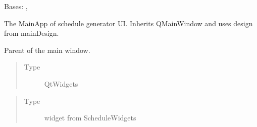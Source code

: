 \documentclass[letterpaper,10pt,english]{sphinxmanual}
\begin{document}
\begin{fulllineitems}
\label{\detokenize{NoSeMazeSchedule/scheduleMain:scheduleMain.MainApp}}
\pysigstartsignatures
{}
\pysigstopsignatures
\sphinxAtStartPar
Bases: , {\hyperref[\detokenize{NoSeMazeSchedule/ScheduleDesigns:ScheduleDesigns.mainDesign.Ui_MainWindow}]{}}

\sphinxAtStartPar
The MainApp of schedule generator UI. Inherits QMainWindow
and uses design from mainDesign.

\begin{fulllineitems}
\label{\detokenize{NoSeMazeSchedule/scheduleMain:scheduleMain.MainApp.parent}}
\pysigstartsignatures
{}
\pysigstopsignatures
\sphinxAtStartPar
Parent of the main window.
\begin{quote}\begin{description}
\item[{Type}] \leavevmode
\sphinxAtStartPar
QtWidgets

\end{description}\end{quote}

\end{fulllineitems}


\begin{fulllineitems}
\label{\detokenize{NoSeMazeSchedule/scheduleMain:scheduleMain.MainApp.current_schedule_type}}
\pysigstartsignatures
{}
\pysigstopsignatures\begin{quote}\begin{description}
\item[{Type}] \leavevmode
\sphinxAtStartPar
widget from ScheduleWidgets

\end{description}\end{quote}


\end{fulllineitems}
\end{fulllineitems}
\end{document}
